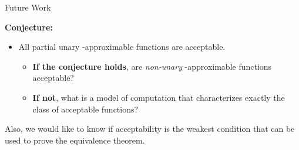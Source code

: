 \begin{frame}{Future Work}

    \pause \textbf{Conjecture:}
    \begin{itemize}
        \item All partial unary \WhileCC-approximable functions are acceptable.
        \begin{itemize}
            \pause \item \textbf{If the conjecture holds}, are \emph{non-unary} \WhileCC-approximable functions acceptable?
            \pause \item  \textbf{If not}, what is a model of computation that characterizes exactly the class of acceptable functions?
        \end{itemize}
    \end{itemize}
    \pause
    Also, we would like to know if acceptability is the weakest condition that can be used to prove the equivalence theorem.
\end{frame}